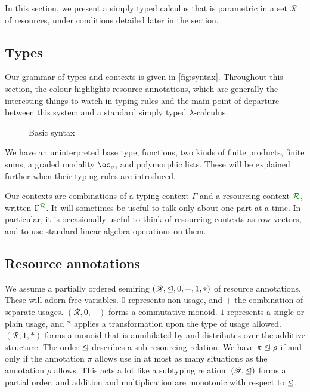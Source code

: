 In this section, we present a simply typed calculus that is parametric in a set
$\mathscr{R}$ of resources, under conditions detailed later in the section.

\subsection{Types}

Our grammar of types and contexts is given in \autoref{fig:syntax}.
Throughout this section, the colour  highlights resource
annotations, which are generally the interesting things to watch in typing rules
and the main point of departure between this system and a standard simply typed
$\lambda$-calculus.

\begin{figure}
  \caption{Basic syntax}
  \label{fig:syntax}
\end{figure}

We have an uninterpreted base type, functions, two kinds of finite products,
finite sums, a graded modality $\excl{\rho}{}$, and polymorphic lists.
These will be explained further when their typing rules are introduced.

Our contexts are combinations of a typing context $\Gamma$ and a resourcing
context $\resctx R$, written $\ctx{\Gamma}{R}$.
It will sometimes be useful to talk only about one part at a time.
In particular, it is occasionally useful to think of resourcing contexts as row
vectors, and to use standard linear algebra operations on them.

\subsection{Resource annotations}
\label{sec:annotations}

We assume a partially ordered semiring $(\mathscr{R}, \trianglelefteq, 0, +, 1, *)$ of
resource annotations.
These will adorn free variables.
$0$ represents non-usage, and $+$ the combination of separate usages.
$(\mathscr{R}, 0, +)$ forms a commutative monoid.
$1$ represents a single or plain usage, and $*$ applies a transformation upon
the type of usage allowed.
$(\mathscr{R}, 1, *)$ forms a monoid that is annihilated by and distributes over
the additive structure.
The order $\trianglelefteq$ describes a sub-resourcing relation.
We have $\pi \trianglelefteq \rho$ if and only if the annotation $\pi$ allows use in at
most as many situations as the annotation $\rho$ allows.
This acts a lot like a subtyping relation.
$(\mathscr{R}, \trianglelefteq)$ forms a partial order, and addition and multiplication
are monotonic with respect to $\trianglelefteq$.

